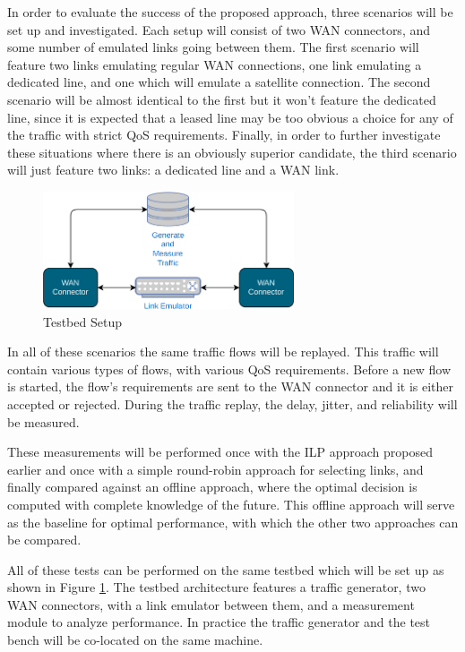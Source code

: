 In order to evaluate the success of the proposed approach, three scenarios will be set up and investigated. Each setup will consist of two WAN connectors, and some number of emulated links going between them. The first scenario will feature two links emulating regular WAN connections, one link emulating a dedicated line, and one which will emulate a satellite connection. The second scenario will be almost identical to the first but it won't feature the dedicated line, since it is expected that a leased line may be too obvious a choice for any of the traffic with strict QoS requirements. Finally, in order to further investigate these situations where there is an obviously superior candidate, the third scenario will just feature two links: a dedicated line and a WAN link.

\begin{figure}[h]
    \centering
        \includegraphics[width=0.66\textwidth]{fig/testbed.png}
        \caption{Testbed Setup}
        \label{fig:testbed}
\end{figure}

In all of these scenarios the same traffic flows will be replayed. This traffic will contain various types of flows, with various QoS requirements. Before a new flow is started, the flow's requirements are sent to the WAN connector and it is either accepted or rejected. During the traffic replay, the delay, jitter, and reliability will be measured.

These measurements will be performed once with the ILP approach proposed earlier and once with a simple round-robin approach for selecting links, and finally compared against an offline approach, where the optimal decision is computed with complete knowledge of the future. This offline approach will serve as the baseline for optimal performance, with which the other two approaches can be compared.

All of these tests can be performed on the same testbed which will be set up as shown in Figure \ref{fig:testbed}. The testbed architecture features a traffic generator, two WAN connectors, with a link emulator between them, and a measurement module to analyze performance. In practice the traffic generator and the test bench will be co-located on the same machine.

